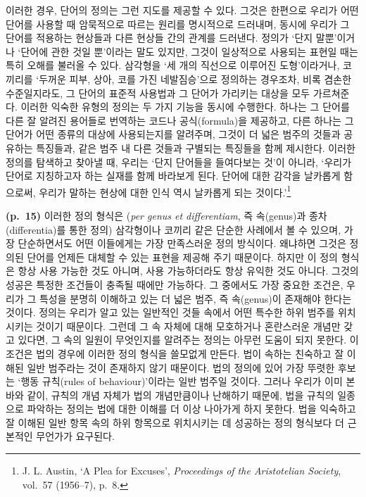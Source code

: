\documentclass[12pt, oneside]{book}  %
\begin{document}
이러한 경우, 단어의 정의는 그런 지도를 제공할 수 있다. 그것은 한편으로
우리가 어떤 단어를 사용할 때 암묵적으로 따르는 원리를 명시적으로
드러내며, 동시에 우리가 그 단어를 적용하는 현상들과 다른 현상들 간의
관계를 드러낸다. 정의가 `단지 말뿐'이거나 `단어에 관한 것일 뿐'이라는
말도 있지만, 그것이 일상적으로 사용되는 표현일 때는 특히 오해를 불러올
수 있다. 삼각형을 `세 개의 직선으로 이루어진 도형'이라거나, 코끼리를
`두꺼운 피부, 상아, 코를 가진 네발짐승'으로 정의하는 경우조차, 비록
겸손한 수준일지라도, 그 단어의 표준적 사용법과 그 단어가 가리키는 대상을
모두 가르쳐준다. 이러한 익숙한 유형의 정의는 두 가지 기능을 동시에
수행한다. 하나는 그 단어를 다른 잘 알려진 용어들로 번역하는 코드나
공식(formula)을 제공하고, 다른 하나는 그 단어가 어떤 종류의 대상에
사용되는지를 알려주며, 그것이 더 넓은 범주의 것들과 공유하는 특징들과,
같은 범주 내 다른 것들과 구별되는 특징들을 함께 제시한다. 이러한 정의를
탐색하고 찾아낼 때, 우리는 `단지 단어들을 들여다보는 것'이 아니라,
`우리가 단어로 지칭하고자 하는 실재를 함께 바라보게 된다. 단어에 대한
감각을 날카롭게 함으로써, 우리가 말하는 현상에 대한 인식 역시 날카롭게
되는 것이다.'\footnote{J. L. Austin, `A Plea for Excuses',
  \emph{Proceedings of the Aristotelian Society}, vol.~57 (1956--7),
  p.~8.}

\textbf{(p.~15)} 이러한 정의 형식은 (\emph{per genus et differentiam},
즉 속(genus)과 종차(differentia)를 통한 정의) 삼각형이나 코끼리 같은
단순한 사례에서 볼 수 있으며, 가장 단순하면서도 어떤 이들에게는 가장
만족스러운 정의 방식이다. 왜냐하면 그것은 정의된 단어를 언제든 대체할 수
있는 표현을 제공해 주기 때문이다. 하지만 이 정의 형식은 항상 사용 가능한
것도 아니며, 사용 가능하더라도 항상 유익한 것도 아니다. 그것의 성공은
특정한 조건들이 충족될 때에만 가능하다. 그 중에서도 가장 중요한 조건은,
우리가 그 특성을 분명히 이해하고 있는 더 넓은 범주, 즉 속(genus)이
존재해야 한다는 것이다. 정의는 우리가 알고 있는 일반적인 것들 속에서
어떤 특수한 하위 범주를 위치시키는 것이기 때문이다. 그런데 그 속 자체에
대해 모호하거나 혼란스러운 개념만 갖고 있다면, 그 속의 일원이 무엇인지를
알려주는 정의는 아무런 도움이 되지 못한다. 이 조건은 법의 경우에 이러한
정의 형식을 쓸모없게 만든다. 법이 속하는 친숙하고 잘 이해된 일반
범주라는 것이 존재하지 않기 때문이다. 법의 정의에 있어 가장 뚜렷한
후보는 `행동 규칙(rules of behaviour)'이라는 일반 범주일 것이다. 그러나
우리가 이미 본 바와 같이, 규칙의 개념 자체가 법의 개념만큼이나 난해하기
때문에, 법을 규칙의 일종으로 파악하는 정의는 법에 대한 이해를 더 이상
나아가게 하지 못한다. 법을 익숙하고 잘 이해된 일반 항목 속의 하위
항목으로 위치시키는 데 성공하는 정의 형식보다 더 근본적인 무언가가
요구된다.
\end{document}
